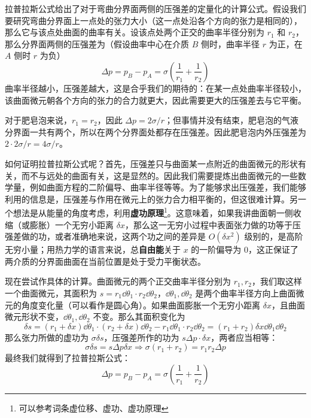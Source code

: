 拉普拉斯公式给出了对于弯曲分界面两侧的压强差的定量化的计算公式。假设我们要研究弯曲分界面上一点处的张力大小（这一点处沿各个方向的张力是相同的），那么它与该点处曲面的曲率有关。设该点处两个正交的曲率半径分别为 $r_1$ 和 $r_2$，那么分界面两侧的压强差为（假设曲率中心在介质 $B$ 侧时，曲率半径 $r$ 为正，在 $A$ 侧时 $r$ 为负）
\begin{equation}
\Delta p=p_B-p_A=\sigma(\frac{1}{r_1}+\frac{1}{r_2})
\end{equation}
曲率半径越小，压强差越大，这是合乎我们的期待的：在某一点处曲率半径较小，该曲面微元朝各个方向的张力的合力就更大，因此需要更大的压强差去与它平衡。

对于肥皂泡来说，$r_1=r_2$，因此 $\Delta p=2\sigma/r$；但事情并没有结束，肥皂泡的气液分界面一共有两个，所以在两个分界面处都存在压强差。因此肥皂泡内外压强差为 $2\cdot 2\sigma/r=4\sigma/r$。

如何证明拉普拉斯公式呢？首先，压强差只与曲面某一点附近的曲面微元的形状有关，而不与远处的曲面有关，这是显然的。因此我们需要提炼出曲面微元的一些数学量，例如曲面方程的二阶偏导、曲率半径等等。为了能够求出压强差，我们能够利用的信息是，压强差与作用在微元上的张力合力相平衡的，但这很难计算。另一个想法是从能量的角度考虑，利用\textbf{虚功原理}\footnote{可以参考词条虚位移、虚功、虚功原理}。这意味着，如果我讲曲面朝一侧收缩（或膨胀）一个无穷小距离 $\delta x$，那么这一无穷小过程中表面张力做的功等于压强差做的功，或者准确地来说，这两个功之间的差异是 $O(\delta x^2)$ 级别的，是高阶无穷小量；用热力学的语言来说，总\textbf{自由能}关于 $x$ 的一阶偏导为 $0$，这正保证了两介质的分界面曲面在当前位置是处于受力平衡状态。

现在尝试作具体的计算。曲面微元的两个正交曲率半径分别为 $r_1,r_2$，我们取这样一个曲面微元，其面积为 $s=r_1 \dd \theta_1 \cdot r_2 \dd \theta_2$，$\dd\theta_1,\dd\theta_2$ 是两个曲率半径方向上曲面微元的角度变化量（可以看作是圆心角）。如果曲面膨胀一个无穷小距离 $\delta x$，且曲面微元形状不变，$\dd \theta_1,\dd \theta_2$ 不变。那么其面积变化为
\begin{equation}
\delta s=(r_1+\delta x)\dd \theta_1\cdot 
(r_2+\delta x)\dd \theta_2 - r_1 \dd \theta_1 \cdot r_2 \dd \theta_2=(r_1+r_2)\delta x \dd \theta_1\dd \theta_2
\end{equation}
那么张力所做的虚功为 $\sigma \delta s$，压强差所作的功为 $s\Delta p \cdot \delta x$，两者应当相等：
\begin{equation}
\sigma\delta s=s\Delta p \delta x\Rightarrow \sigma(r_1+r_2)=r_1r_2\Delta p
\end{equation}
最终我们就得到了拉普拉斯公式：
\begin{equation}
\Delta p=p_B-p_A=\sigma(\frac{1}{r_1}+\frac{1}{r_2})
\end{equation}


